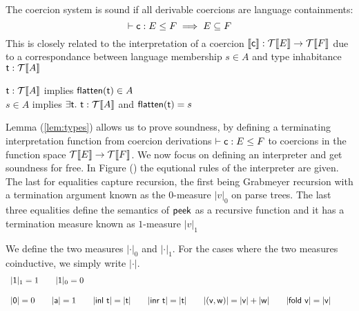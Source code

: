 
The coercion system is sound if all derivable coercions are language containments:
\[\vdash \mathsf{c} : E \leq F \implies E \subseteq F\]
This is closely related to the interpretation of a coercion $\llbracket \mathsf{c} \rrbracket : \mathcal{T}\llbracket E \rrbracket \rightarrow \mathcal{T}\llbracket F \rrbracket$ due to a correspondance between language membership $s \in A$ and type inhabitance $\mathsf{t} : \mathcal{T}\llbracket A \rrbracket$
\begin{lemma}\label{lem:types}
$\mathsf{t} : \mathcal{T}\llbracket A \rrbracket$ implies $\mathsf{flatten}(\mathsf{t}) \in A$\\
$s \in A$ implies $\exists \mathsf{t}.~\mathsf{t} : \mathcal{T}\llbracket A \rrbracket$ and $\mathsf{flatten}(\mathsf{t}) = s$
\end{lemma}
Lemma (\ref{lem:types}) allows us to prove soundness, by defining a terminating interpretation function from coercion derivations $\vdash \mathsf{c} : E \leq F$ to coercions in the function space $\mathcal{T}\llbracket E \rrbracket \rightarrow \mathcal{T}\llbracket F \rrbracket$.
We now focus on defining an interpreter and get soundness for free. In Figure (\label{fig:interp}) the equtional rules of the interpreter are given. The last for equalities capture recursion, the first being Grabmeyer recursion with a termination argument known as the $0$-measure $|v|_0$ on parse trees. The last three equalities define the semantics of $\mathsf{peek}$ as a recursive function and it has a termination measure known as $1$-measure $|v|_1$ 
\begin{definition}
We define the two measures $|\cdot|_0$ and $|\cdot|_1$. For the cases where the two measures coinductive, we simply write $|\cdot|$.
  \begin{displaymath}
    \begin{array}{lll}
|\mathsf{1}|_1 = 1 \qquad |\mathsf{1}|_0 = 0
\\\\
 |\mathsf{0}| = 0 \qquad |\mathsf{a}| = 1 \qquad |\mathsf{inl~ t}| = |\mathsf{t}| \qquad |\mathsf{inr~ t}| = |\mathsf{t}| \qquad  |\mathsf{(v,w)}|=|\mathsf{v}|+|\mathsf{w}| \qquad  |\mathsf{fold~v}|=|\mathsf{v}|\qquad


    \end{array}
  \end{displaymath}
\end{definition}
